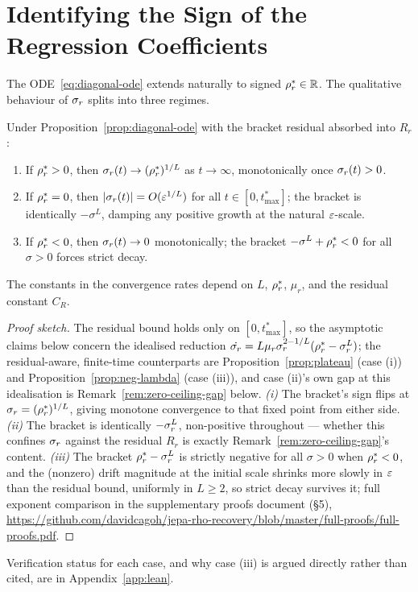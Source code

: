\section{Identifying the Sign of the Regression Coefficients}
\label{sec:trichotomy}

The ODE~\eqref{eq:diagonal-ode} extends naturally to signed
$\rho_r^* \in \mathbb{R}$. The qualitative behaviour of $\sigma_r$ splits
into three regimes.

\begin{theorem}
\label{thm:trichotomy}
Under Proposition~\ref{prop:diagonal-ode} with the bracket residual
absorbed into $R_r$:
\begin{enumerate}[label=(\roman*),leftmargin=2em,itemsep=2pt]
\item If $\rho_r^* > 0$, then $\sigma_r(t) \to (\rho_r^*)^{1/L}$ as
$t \to \infty$, monotonically once $\sigma_r(t) > 0$.
\item If $\rho_r^* = 0$, then
$|\sigma_r(t)| = O(\varepsilon^{1/L})$ for all $t \in [0, t_{\max}^*]$;
the bracket is identically $-\sigma^L$, damping any positive growth at
the natural $\varepsilon$-scale.
\item If $\rho_r^* < 0$, then $\sigma_r(t) \to 0$ monotonically;
the bracket $-\sigma^L + \rho_r^* < 0$ for all $\sigma > 0$ forces
strict decay.
\end{enumerate}
The constants in the convergence rates depend on $L$, $\rho_r^*$, $\mu_r$,
and the residual constant $C_R$.
\end{theorem}

\begin{proof}[Proof sketch]
The residual bound holds only on $[0,t_{\max}^*]$, so the asymptotic claims below concern
the idealised reduction $\dot{\sigma_r} = L\mu_r\sigma_r^{2-1/L}(\rho_r^*-\sigma_r^L)$; the
residual-aware, finite-time counterparts are Proposition~\ref{prop:plateau} (case (i)) and
Proposition~\ref{prop:neg-lambda} (case (iii)), and case (ii)'s own gap at this
idealisation is Remark~\ref{rem:zero-ceiling-gap} below.
\emph{(i)} The bracket's sign flips at $\sigma_r=(\rho_r^*)^{1/L}$, giving monotone
convergence to that fixed point from either side.
\emph{(ii)} The bracket is identically $-\sigma_r^L$, non-positive throughout — whether
this confines $\sigma_r$ against the residual $R_r$ is exactly Remark~\ref{rem:zero-ceiling-gap}'s
content.
\emph{(iii)} The bracket $\rho_r^*-\sigma_r^L$ is strictly negative for all $\sigma>0$ when
$\rho_r^*<0$, and the (nonzero) drift magnitude at the initial scale shrinks more slowly
in $\varepsilon$ than the residual bound, uniformly in $L\ge2$, so strict decay survives it;
full exponent comparison in the supplementary proofs document (\S5),
\url{https://github.com/davidcagoh/jepa-rho-recovery/blob/master/full-proofs/full-proofs.pdf}.
\end{proof}
Verification status for each case, and why case (iii) is argued directly rather than
cited, are in Appendix~\ref{app:lean}.

